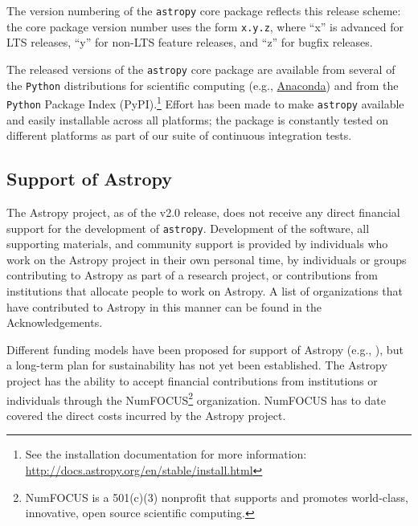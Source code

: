 \documentclass[modern]{aastex61}
\newcommand{\package}[1]{\texttt{#1}\xspace}
\newcommand{\python}{\package{Python}}
\newcommand{\astropy}{Astropy\xspace}
\newcommand{\astropypkg}{\package{astropy}}
\begin{document}
The version numbering of the \astropypkg core package reflects this release
scheme: the core package version number uses the form \texttt{x.y.z}, where ``x'' is
advanced for LTS releases, ``y'' for non-LTS feature releases, and
``z'' for bugfix releases.

The released versions of the \astropypkg core package are available from several
of the \python distributions for scientific computing (e.g.,
\href{http://anaconda.org}{Anaconda}) and from the \python Package Index
(PyPI).\footnote{See the installation documentation for more information:
\url{http://docs.astropy.org/en/stable/install.html}}
Effort has been made to make \astropypkg available and easily installable across
all platforms; the package is constantly tested on different platforms as part
of our suite of continuous integration tests.

\subsection{Support of Astropy}

The \astropy project, as of the v2.0 release, does not receive any direct financial support for
the development of \astropypkg.  Development of the software, all supporting materials, and community support is provided
by individuals who work on the \astropy project in their own personal
time, by individuals or groups contributing to \astropy as
part of a research project, or contributions from institutions that allocate
people to work on \astropy.
A list of organizations that have contributed to \astropy in this manner
can be found in the Acknowledgements.

Different funding models have been proposed for support of \astropy
(e.g., \citealt{2016arXiv161003159M}), but a long-term plan
for sustainability has not yet been established.
The \astropy project has the ability to accept financial contributions
from institutions or individuals through the NumFOCUS\footnote{NumFOCUS
is a 501(c)(3) nonprofit that supports and promotes world-class, innovative,
open source scientific computing.} organization. NumFOCUS has to date covered the direct costs incurred by the \astropy project.



\end{document}
